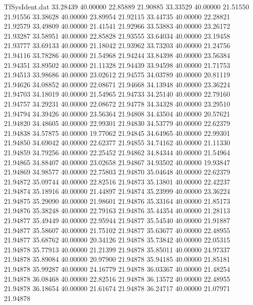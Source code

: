 \begin{filecontents}{TfSysIdent.dat}
  33.28439   40.00000   22.85889   21.90885
  33.33529   40.00000   21.51550   21.91556
  33.38628   40.00000   23.89954   21.92115
  33.44735   40.00000   22.28821   21.92579
  33.49809   40.00000   21.41541   21.92966
  33.53883   40.00000   23.26172   21.93287
  33.58951   40.00000   22.85828   21.93555
  33.64034   40.00000   23.19458   21.93777
  33.69133   40.00000   21.18042   21.93962
  33.73203   40.00000   21.24756   21.94116
  33.78286   40.00000   21.54968   21.94244
  33.84398   40.00000   23.56384   21.94351
  33.89502   40.00000   21.11328   21.94439
  33.94598   40.00000   21.71753   21.94513
  33.98686   40.00000   23.02612   21.94575
  34.03789   40.00000   20.81119   21.94626
  34.08852   40.00000   22.08671   21.94668
  34.13948   40.00000   23.36224   21.94703
  34.18019   40.00000   21.54965   21.94733
  34.25140   40.00000   22.79160   21.94757
  34.29231   40.00000   22.08672   21.94778
  34.34328   40.00000   23.29510   21.94794
  34.39426   40.00000   23.56364   21.94808
  34.43504   40.00000   20.57621   21.94820
  34.48605   40.00000   22.99301   21.94830
  34.53779   40.00000   22.62379   21.94838
  34.57875   40.00000   19.77062   21.94845
  34.64965   40.00000   22.99301   21.94850
  34.69042   40.00000   22.62377   21.94855
  34.74162   40.00000   21.11330   21.94859
  34.79256   40.00000   22.25452   21.94862
  34.84344   40.00000   21.54964   21.94865
  34.88407   40.00000   23.02658   21.94867
  34.93502   40.00000   19.93847   21.94869
  34.98577   40.00000   22.75803   21.94870
  35.04648   40.00000   22.62379   21.94872
  35.09744   40.00000   22.82516   21.94873
  35.13801   40.00000   22.42237   21.94874
  35.18916   40.00000   21.44897   21.94874
  35.23999   40.00000   23.36224   21.94875
  35.29090   40.00000   21.98601   21.94876
  35.33164   40.00000   21.85173   21.94876
  35.38248   40.00000   22.79163   21.94876
  35.44354   40.00000   21.28113   21.94877
  35.49449   40.00000   22.95944   21.94877
  35.54540   40.00000   21.91887   21.94877
  35.58607   40.00000   21.75102   21.94877
  35.63677   40.00000   22.48955   21.94877
  35.68762   40.00000   20.34126   21.94878
  35.73842   40.00000   22.05315   21.94878
  35.77913   40.00000   21.21399   21.94878
  35.85011   40.00000   24.97337   21.94878
  35.89084   40.00000   20.97900   21.94878
  35.94185   40.00000   21.85181   21.94878
  35.99287   40.00000   24.16779   21.94878
  36.03367   40.00000   21.48254   21.94878
  36.08468   40.00000   22.82516   21.94878
  36.13572   40.00000   22.48955   21.94878
  36.18654   40.00000   21.61674   21.94878
  36.24717   40.00000   21.07971   21.94878

\end{filecontents}
